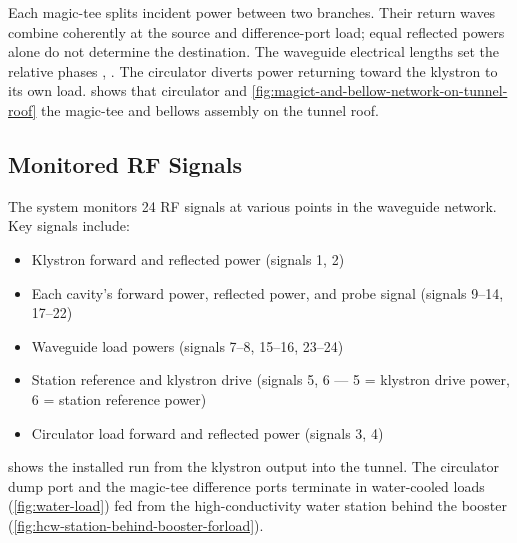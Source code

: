Each magic-tee splits incident power between two branches. Their return waves combine coherently at the source and difference-port load; equal reflected powers alone do not determine the destination. The waveguide electrical lengths set the relative phases , . The circulator diverts power returning toward the klystron to its own load.  shows that circulator and \cref{fig:magict-and-bellow-network-on-tunnel-roof} the magic-tee and bellows assembly on the tunnel roof.



\subsection{Monitored RF Signals}

The system monitors 24 RF signals at various points in the waveguide network. Key signals include:

\begin{itemize}
\tightlist
\item
  Klystron forward and reflected power (signals 1, 2)
\item
  Each cavity's forward power, reflected power, and probe signal (signals 9--14, 17--22)
\item
  Waveguide load powers (signals 7--8, 15--16, 23--24)
\item
  Station reference and klystron drive (signals 5, 6 --- 5 = klystron drive power, 6 = station reference power)
\item
  Circulator load forward and reflected power (signals 3, 4)
\end{itemize}

 shows the installed run from the klystron output into the tunnel. The circulator dump port and the magic-tee difference ports terminate in water-cooled loads (\cref{fig:water-load}) fed from the high-conductivity water station behind the booster (\cref{fig:hcw-station-behind-booster-forload}).

